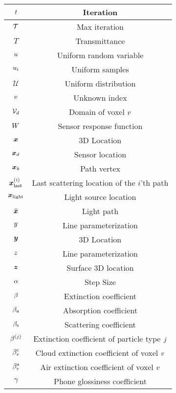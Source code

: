 \begin{center}
\begin{longtable}[c]{|c|c|}
$t$ & Iteration \\ \hline
$\mathcal{T}$ & Max iteration \\ \hline
$T$ & Transmittance \\ \hline

$u$ & Uniform random variable \\ \hline
$u_i$ & Uniform samples \\ \hline
$\mathcal{U}$ & Uniform distribution \\ \hline

$v$ & Unknown index \\ \hline
$\mathcal{V}_{d}$ & Domain of voxel $v$ \\ \hline

$W$ & Sensor response function \\ \hline

$\boldsymbol{x}$ & 3D Location\\ \hline
$\boldsymbol{x}_{d}$ & Sensor location\\ \hline
$\boldsymbol{x}_k$ & Path vertex\\ \hline
$\boldsymbol{x}^{\left({i}\right)}_{\text{last}}$ & Last scattering location of the $i$'th path \\ \hline
$\boldsymbol{x}_{\text{light}}$ & Light source location \\ \hline
$\Bar{\boldsymbol{x}}$ & Light path\\ \hline

$y$ & Line parameterization \\ \hline
$\boldsymbol{y}$ & 3D Location\\ \hline

$z$ & Line parameterization \\ \hline
$\boldsymbol{z}$ & Surface 3D location\\ \hline


$\alpha$ & Step Size \\ \hline

$\beta$ & Extinction coefficient\\ \hline
$\beta_{\text{a}}$ & Absorption coefficient\\ \hline
$\beta_{\text{s}}$ & Scattering coefficient\\ \hline
$\beta^{\left({j}\right)}$ & Extinction coefficient of particle type $j$ \\ \hline
$\beta^{\text{c}}_{v}$ & Cloud extinction coefficient of voxel $v$\\ \hline
$\beta^{\text{a}}_{v}$ & Air extinction coefficient of voxel $v$\\ \hline
$\gamma$ & Phone glossiness coefficient\\ \hline


\end{longtable}
\end{center}
